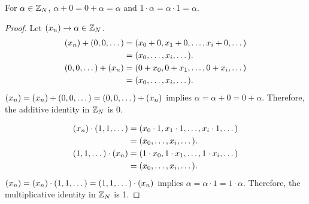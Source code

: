 \begin{lemma}\label{lem:identity}
  For $\alpha \in \mathbb{Z}_N$, $\alpha+0=0+\alpha=\alpha$ and $1\cdot\alpha=\alpha\cdot1=\alpha$.
\end{lemma}
\begin{proof}
  Let $(x_n)\rightarrow\alpha\in\mathbb{Z}_N$.
  \begin{align*}
    (x_n)+(0,0,\dots)&=(x_0+0,x_1+0,\dots,x_i+0,\dots)\\
                     &=(x_0,\dots,x_i,\dots).\\
    (0,0,\dots)+(x_n)&=(0+x_0,0+x_1,\dots,0+x_i,\dots)\\
                     &=(x_0,\dots,x_i,\dots).
  \end{align*}
  $(x_n)=(x_n)+(0,0,\dots)=(0,0,\dots)+(x_n)$ implies $\alpha=\alpha+0=0+\alpha$.
  Therefore, the additive identity in $\mathbb{Z}_N$ is 0.

  \begin{align*}
    (x_n)\cdot(1,1,\dots)&=(x_0\cdot 1,x_1\cdot 1,\dots,x_i\cdot 1,\dots)\\
                         &=(x_0,\dots,x_i,\dots).\\
    (1,1,\dots)\cdot(x_n)&=(1\cdot x_0,1\cdot x_1,\dots,1\cdot x_i,\dots)\\
                         &=(x_0,\dots,x_i,\dots).
  \end{align*}
   $(x_n)=(x_n)\cdot(1,1,\dots)=(1,1,\dots)\cdot(x_n)$ implies $\alpha=\alpha\cdot1=1\cdot\alpha$.
  Therefore, the multiplicative identity in $\mathbb{Z}_N$ is 1.
\end{proof}   

